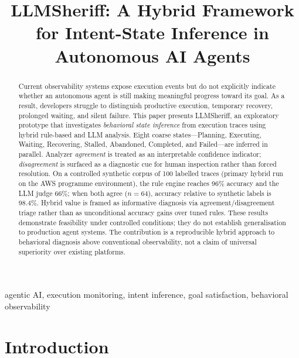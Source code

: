 \documentclass[conference]{IEEEtran}
\begin{document}
\title{LLMSheriff: A Hybrid Framework for Intent-State Inference in Autonomous AI Agents}

\author{
}

\maketitle

\begin{abstract}
Current observability systems expose execution events but do not explicitly indicate
whether an autonomous agent is still making meaningful progress toward its goal. As a
result, developers struggle to distinguish productive execution, temporary recovery,
prolonged waiting, and silent failure. This paper presents LLMSheriff, an exploratory
prototype that investigates \emph{behavioral state inference} from execution traces using
hybrid rule-based and LLM analysis. Eight coarse states---Planning, Executing, Waiting,
Recovering, Stalled, Abandoned, Completed, and Failed---are inferred in parallel. Analyzer
\emph{agreement} is treated as an interpretable confidence indicator; \emph{disagreement}
is surfaced as a diagnostic cue for human inspection rather than forced resolution.
On a controlled synthetic corpus of 100 labelled traces (primary hybrid run on the AWS
programme environment), the rule engine reaches 96\% accuracy and the LLM judge 66\%;
when both agree ($n{=}64$), accuracy relative to synthetic labels is 98.4\%. Hybrid value
is framed as informative diagnosis via agreement/disagreement triage rather than as
unconditional accuracy gains over tuned rules. These results demonstrate feasibility under
controlled conditions; they do not establish generalisation to production agent systems.
The contribution is a reproducible hybrid approach to behavioral diagnosis above
conventional observability, not a claim of universal superiority over existing platforms.
\end{abstract}

\begin{IEEEkeywords}
agentic AI, execution monitoring, intent inference, goal satisfaction, behavioral observability
\end{IEEEkeywords}

\section{Introduction}
\end{document}
